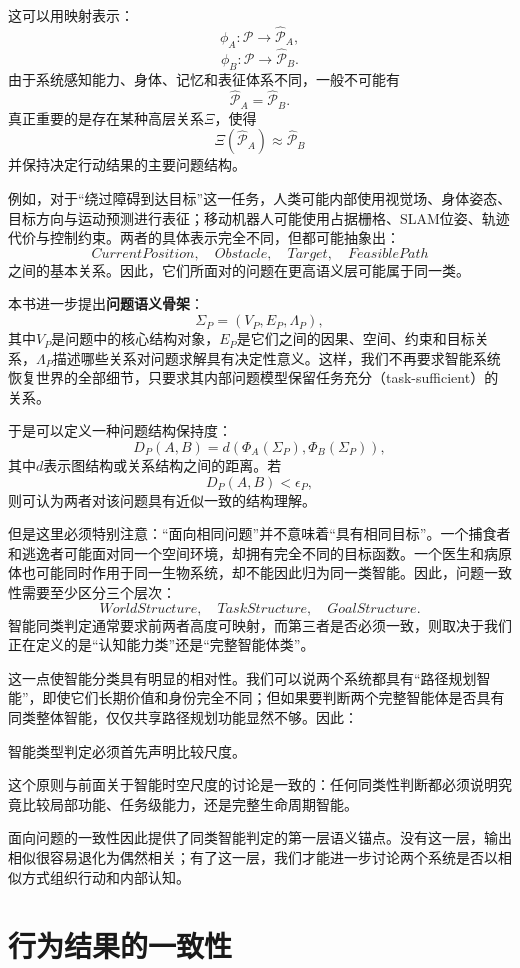 这可以用映射表示：
\[
\phi_A:\mathcal P\rightarrow\hat{\mathcal P}_A,
\]
\[
\phi_B:\mathcal P\rightarrow\hat{\mathcal P}_B.
\]
由于系统感知能力、身体、记忆和表征体系不同，一般不可能有
\[
\hat{\mathcal P}_A=\hat{\mathcal P}_B.
\]
真正重要的是存在某种高层关系$\Xi$，使得
\[
\Xi(\hat{\mathcal P}_A)
\approx
\hat{\mathcal P}_B
\]
并保持决定行动结果的主要问题结构。

例如，对于``绕过障碍到达目标''这一任务，人类可能内部使用视觉场、身体姿态、目标方向与运动预测进行表征；移动机器人可能使用占据栅格、SLAM位姿、轨迹代价与控制约束。两者的具体表示完全不同，但都可能抽象出：
\[
CurrentPosition,
\quad
Obstacle,
\quad
Target,
\quad
FeasiblePath
\]
之间的基本关系。因此，它们所面对的问题在更高语义层可能属于同一类。

本书进一步提出\textbf{问题语义骨架}：
\[
\Sigma_P=
(V_P,E_P,\Lambda_P),
\]
其中$V_P$是问题中的核心结构对象，$E_P$是它们之间的因果、空间、约束和目标关系，$\Lambda_P$描述哪些关系对问题求解具有决定性意义。这样，我们不再要求智能系统恢复世界的全部细节，只要求其内部问题模型保留任务充分（task-sufficient）的关系。

于是可以定义一种问题结构保持度：
\[
D_P(A,B)
=
d\left(
\Phi_A(\Sigma_P),
\Phi_B(\Sigma_P)
\right),
\]
其中$d$表示图结构或关系结构之间的距离。若
\[
D_P(A,B)<\epsilon_P,
\]
则可认为两者对该问题具有近似一致的结构理解。

但是这里必须特别注意：``面向相同问题''并不意味着``具有相同目标''。一个捕食者和逃逸者可能面对同一个空间环境，却拥有完全不同的目标函数。一个医生和病原体也可能同时作用于同一生物系统，却不能因此归为同一类智能。因此，问题一致性需要至少区分三个层次：
\[
WorldStructure,
\quad
TaskStructure,
\quad
GoalStructure.
\]
智能同类判定通常要求前两者高度可映射，而第三者是否必须一致，则取决于我们正在定义的是``认知能力类''还是``完整智能体类''。

这一点使智能分类具有明显的相对性。我们可以说两个系统都具有``路径规划智能''，即使它们长期价值和身份完全不同；但如果要判断两个完整智能体是否具有同类整体智能，仅仅共享路径规划功能显然不够。因此：
\begin{proposition*}
智能类型判定必须首先声明比较尺度。
\end{proposition*}
这个原则与前面关于智能时空尺度的讨论是一致的：任何同类性判断都必须说明究竟比较局部功能、任务级能力，还是完整生命周期智能。

面向问题的一致性因此提供了同类智能判定的第一层语义锚点。没有这一层，输出相似很容易退化为偶然相关；有了这一层，我们才能进一步讨论两个系统是否以相似方式组织行动和内部认知。

\section{行为结果的一致性}

